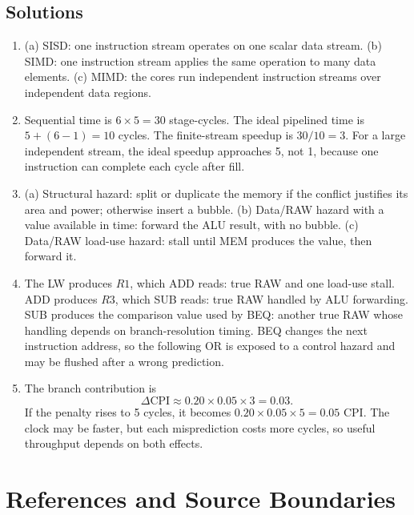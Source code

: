 \documentclass[11pt]{article}
\begin{document}
\subsection*{Solutions}
\begingroup\small
\begin{enumerate}
  \item (a) SISD: one instruction stream operates on one scalar data stream.
        (b) SIMD: one instruction stream applies the same operation to many
        data elements. (c) MIMD: the cores run independent instruction streams
        over independent data regions.
  \item Sequential time is $6\times5=30$ stage-cycles. The ideal pipelined
        time is $5+(6-1)=10$ cycles. The finite-stream speedup is $30/10=3$.
        For a large independent stream, the ideal speedup approaches 5, not
        1, because one instruction can complete each cycle after fill.
  \item (a) Structural hazard: split or duplicate the memory if the conflict
        justifies its area and power; otherwise insert a bubble. (b) Data/RAW
        hazard with a value available in time: forward the ALU result, with no
        bubble. (c) Data/RAW load-use hazard: stall until MEM produces the
        value, then forward it.
  \item The LW produces $R1$, which ADD reads: true RAW and one load-use stall.
        ADD produces $R3$, which SUB reads: true RAW handled by ALU
        forwarding. SUB produces the comparison value used by BEQ: another
        true RAW whose handling depends on branch-resolution timing. BEQ
        changes the next instruction address, so the following OR is exposed
        to a control hazard and may be flushed after a wrong prediction.
  \item The branch contribution is
        \[
          \Delta\mathrm{CPI}\approx0.20\times0.05\times3=0.03.
        \]
        If the penalty rises to 5 cycles, it becomes
        $0.20\times0.05\times5=0.05$ CPI. The clock may be faster, but each
        misprediction costs more cycles, so useful throughput depends on both
        effects.
\end{enumerate}
\endgroup

\section*{References and Source Boundaries}
\end{document}
